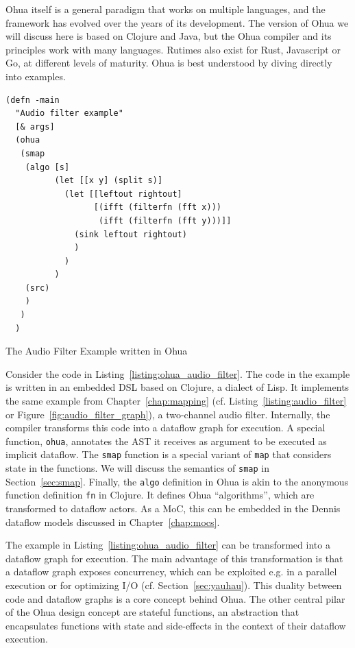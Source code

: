 Ohua itself is a general paradigm that works on multiple languages, and the framework has evolved over the years of its development.
The version of Ohua we will discuss here is based on Clojure and Java, but the Ohua compiler and its principles work with many languages.
Rutimes also exist for Rust, Javascript or Go, at different levels of maturity.
Ohua is best understood by diving directly into examples. 

\begin{listing}
\begin{verbatim}
(defn -main
  "Audio filter example"
  [& args]
  (ohua
   (smap
    (algo [s]
          (let [[x y] (split s)]
            (let [[leftout rightout]
                  [(ifft (filterfn (fft x)))
                   (ifft (filterfn (fft y)))]]
              (sink leftout rightout)
              )
            )
          )
    (src)
    )
   )
  )
\end{verbatim}
\caption{The Audio Filter Example written in Ohua}
\label{listing:ohua_audio_filter}
\end{listing}

Consider the code in Listing~\ref{listing:ohua_audio_filter}. The code in the example is written in an embedded \ac{DSL} based on Clojure, a dialect of Lisp.
It implements the same example from Chapter~\ref{chap:mapping} (cf. Listing~\ref{listing:audio_filter} or Figure~\ref{fig:audio_filter_graph}), a two-channel audio filter.
Internally, the compiler transforms this code into a dataflow graph for execution.
A special function, \texttt{ohua}, annotates the \ac{AST} it receives as argument to be executed as implicit dataflow.
The \texttt{smap} function is a special variant of \texttt{map} that considers state in the functions.
We will discuss the semantics of \texttt{smap} in Section~\ref{sec:smap}.
Finally, the \texttt{algo} definition in Ohua is akin to the anonymous function definition \texttt{fn} in Clojure.
It defines Ohua ``algorithms'', which are transformed to dataflow actors.
As a \ac{MoC}, this can be embedded in the Dennis dataflow models discussed in Chapter~\ref{chap:mocs}.

The example in Listing~\ref{listing:ohua_audio_filter} can be transformed into a dataflow graph for execution.%
The main advantage of this transformation is that a dataflow graph exposes concurrency, which can be exploited e.g. in a parallel execution or for optimizing \ac{I/O} (cf. Section~\ref{sec:yauhau}).
This duality between code and dataflow graphs is a core concept behind Ohua.
The other central pilar of the Ohua design concept are stateful functions, an abstraction that encapsulates functions with state and side-effects in the context of their dataflow execution.

